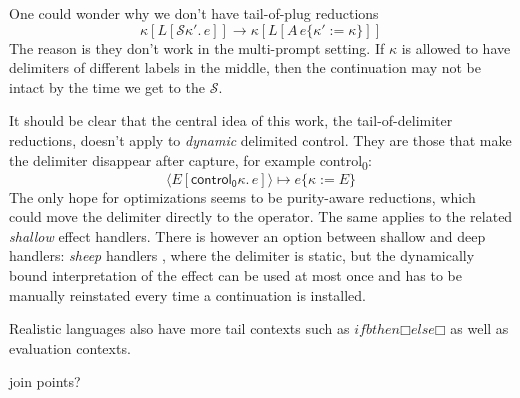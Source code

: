 \documentclass[a4paper, 11pt,titlepage, openright, twoside]{report}
\newcommand{\subst}[2]{\{#1{:=}#2\}}
\renewcommand{\S}{\mathcal{S}}
\newcommand{\+}{\enspace}
\begin{document}
One could wonder why we don't have tail-of-plug reductions
$$κ[L[\S κ'.\,e]] → κ[L[A\,e\subst{κ'}{κ}]]$$
The reason is they don't work in the multi-prompt setting.
If $κ$ is allowed to have delimiters of different labels in the middle, then
the continuation may not be intact by the time we get to the $\S$.

It should be clear that the central idea of this work, the tail-of-delimiter reductions,
doesn't apply to \textit{dynamic} delimited control.
They are those that make the delimiter disappear after capture, for example \textsf{control\textsubscript{0}}:
$$⟨E[\mathsf{control_0} κ.\,e]⟩ ↦ e\subst{κ}{E}$$
The only hope for optimizations seems to be purity-aware reductions,
which could move the delimiter directly to the operator. The same applies to the related \textit{shallow} effect handlers.
There is however an option between shallow and deep handlers: \textit{sheep} handlers \cite{sheep},
where the delimiter is static,
but the dynamically bound interpretation of the effect can be used at most once
and has to be manually reinstated every time a continuation is installed.




Realistic languages also have more tail contexts such as $if b then □ else □$ as well as evaluation contexts.

join points?

\printbibliography[heading=bibintoc]
\end{document}
